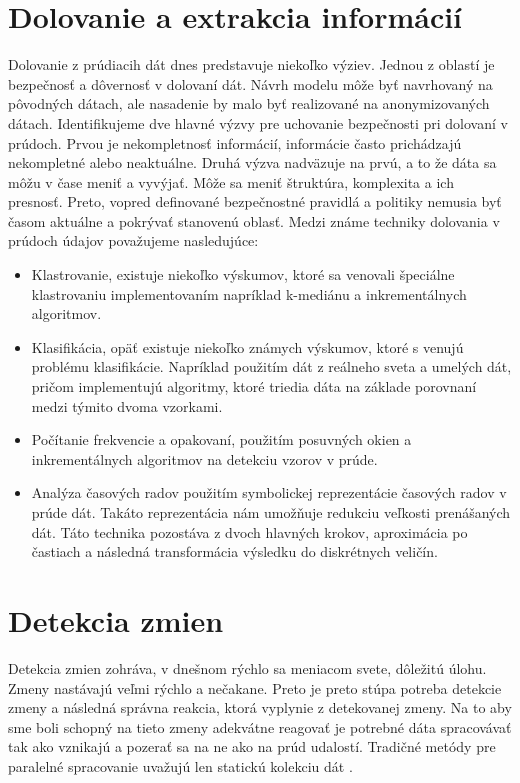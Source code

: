 \section{Dolovanie a extrakcia informácií} 
Dolovanie z prúdiacih dát dnes predstavuje niekoľko výziev. Jednou z oblastí je bezpečnosť a dôvernosť v dolovaní dát. Návrh modelu môže byť navrhovaný na pôvodných dátach, ale nasadenie by malo byť realizované na anonymizovaných dátach. Identifikujeme dve hlavné výzvy pre uchovanie bezpečnosti pri dolovaní v prúdoch. Prvou je nekompletnosť informácií, informácie často prichádzajú nekompletné alebo neaktuálne. Druhá výzva nadväzuje na prvú, a to že dáta sa môžu v čase meniť a vyvýjať. Môže sa meniť štruktúra, komplexita a ich presnosť. Preto, vopred definované bezpečnostné pravidlá a politiky nemusia byť časom aktuálne a pokrývať stanovenú oblasť. Medzi známe techniky dolovania v prúdoch údajov považujeme nasledujúce:
\\
\begin{itemize}
	\item Klastrovanie, existuje niekoľko výskumov, ktoré sa venovali špeciálne klastrovaniu implementovaním napríklad k-mediánu a inkrementálnych algoritmov.
	\item Klasifikácia, opäť existuje niekoľko známych výskumov, ktoré s venujú problému klasifikácie. Napríklad použitím dát z reálneho sveta a umelých dát, pričom implementujú algoritmy, ktoré triedia dáta na základe porovnaní medzi týmito dvoma vzorkami.
	\item Počítanie frekvencie a opakovaní, použitím posuvných okien a inkrementálnych algoritmov na detekciu vzorov v prúde.
	\item Analýza časových radov použitím symbolickej reprezentácie časových radov v prúde dát. Takáto reprezentácia nám umožňuje redukciu veľkosti prenášaných dát. Táto technika pozostáva z dvoch hlavných krokov, aproximácia po častiach a následná transformácia výsledku do diskrétnych veličín.
\end{itemize}

\section{Detekcia zmien}
Detekcia zmien zohráva, v dnešnom rýchlo sa meniacom svete, dôležitú úlohu. Zmeny nastávajú veľmi rýchlo a nečakane. Preto je preto stúpa potreba detekcie zmeny a následná správna reakcia, ktorá vyplynie z detekovanej zmeny. Na to aby sme boli schopný na tieto zmeny adekvátne reagovať je potrebné dáta spracovávať tak ako vznikajú a pozerať sa na ne ako na prúd udalostí. Tradičné metódy pre paralelné spracovanie uvažujú len statickú kolekciu dát \citep{tran2014change}.\\

